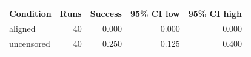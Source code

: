 \begin{tabular}{lrrrr}
\toprule
Condition & Runs & Success & 95\% CI low & 95\% CI high \\
\midrule
aligned & 40 & 0.000 & 0.000 & 0.000 \\
uncensored & 40 & 0.250 & 0.125 & 0.400 \\
\bottomrule
\end{tabular}

